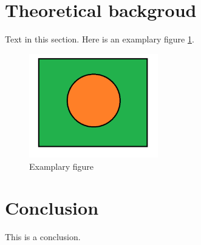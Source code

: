 \documentclass[e-only,10pt,reqno]{ofj}
\newcommand{\authorcontributions}[1]{%
\vspace{6pt}\noindent{\fontsize{9}{11.2}\selectfont\textbf{Author Contributions:} {#1}\par}}
\begin{document}
\section{Theoretical backgroud}

Text in this section. Here is an examplary figure \ref{fig:example}.

\begin{figure}
\includegraphics[width=0.5\textwidth]{example.png}
\caption{Examplary figure}
\label{fig:example}
\end{figure}


\section{Conclusion}

This is a conclusion.


%


 
\end{document}
